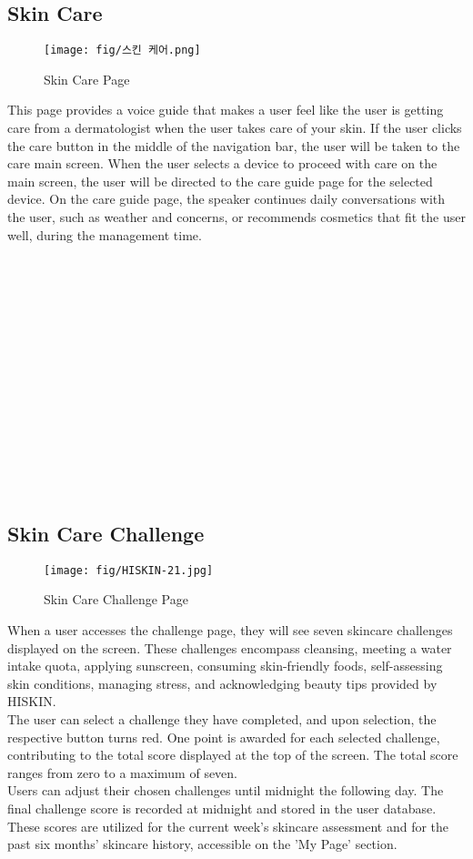 \documentclass[conference]{IEEEtran}
\begin{document}
\subsection{Skin Care}
\begin{figure}[h]
    \centering
    \texttt{[image: fig/스킨 케어.png]}
    \label{fig:Skin Care Page}
    \caption{Skin Care Page} 
    \end{figure}
This page provides a voice guide that makes a user feel like the user is getting care from a dermatologist when the user takes care of your skin. If the user clicks the care button in the middle of the navigation bar, the user will be taken to the care main screen. When the user selects a device to proceed with care on the main screen, the user will be directed to the care guide page for the selected device. On the care guide page, the speaker continues daily conversations with the user, such as weather and concerns, or recommends cosmetics that fit the user well, during the management time.\\ \\ \\ \\ \\ \\ \\ \\ \\ \\ \\ \\ \\ \\ \\

\subsection{Skin Care Challenge} 
    \begin{figure}[h]
    \centering
    \texttt{[image: fig/HISKIN-21.jpg]}
    \label{fig:Skin Care Challenge Page}
    \caption{Skin Care Challenge Page} 
    \end{figure}
    When a user accesses the challenge page, they will see seven skincare challenges displayed on the screen. These challenges encompass cleansing, meeting a water intake quota, applying sunscreen, consuming skin-friendly foods, self-assessing skin conditions, managing stress, and acknowledging beauty tips provided by HISKIN.\\
    The user can select a challenge they have completed, and upon selection, the respective button turns red. One point is awarded for each selected challenge, contributing to the total score displayed at the top of the screen. The total score ranges from zero to a maximum of seven.\\
    Users can adjust their chosen challenges until midnight the following day. The final challenge score is recorded at midnight and stored in the user database. These scores are utilized for the current week’s skincare assessment and for the past six months’ skincare history, accessible on the 'My Page' section. \\
    \clearpage
\end{document}

